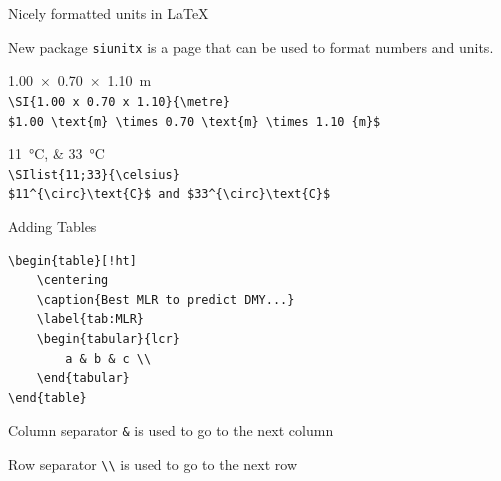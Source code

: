 \documentclass[final,aspectratio=43]{beamer}
\begin{document}
\begin{frame}{Nicely formatted units in \LaTeX}
    \begin{block}{New package}
        \texttt{siunitx} is a page that can be used to format numbers and units.
    \end{block}

    \SI{1.00 x 0.70 x 1.10}{\metre}\\
    \texttt{\textbackslash SI\{1.00 x 0.70 x 1.10\}\{\textbackslash metre\}}\\
    \texttt{\$1.00 \textbackslash text\{m\} \textbackslash times 0.70 \textbackslash text\{m\} \textbackslash times 1.10 \text\{m\}\$}
    
    \SIlist{11;33}{\celsius}\\
    \texttt{\textbackslash SIlist\{11;33\}\{\textbackslash celsius\}}\\
    \texttt{\$11\^{}\{\textbackslash circ\}\textbackslash text\{C\}\$ and \$33\^{}\{\textbackslash circ\}\textbackslash text\{C\}\$}
\end{frame}

\begin{frame}[fragile]{Adding Tables}
    \begin{lstlisting}[basicstyle=\ttfamily\small]
\begin{table}[!ht]
    \centering
    \caption{Best MLR to predict DMY...}
    \label{tab:MLR}
    \begin{tabular}{lcr}
        a & b & c \\
    \end{tabular}
\end{table}
    \end{lstlisting}
    
    \begin{block}{Column separator}
        \texttt{\&} is used to go to the next column
    \end{block}
    
    \begin{block}{Row separator}
        \texttt{\textbackslash\textbackslash} is used to go to the next row
    \end{block}
\end{frame}
\end{document}
